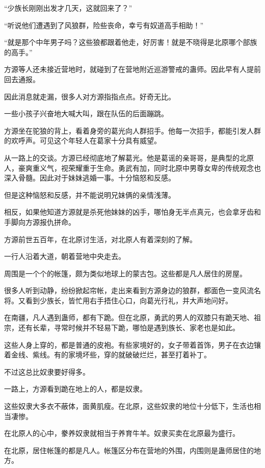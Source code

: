 \begin{this_body}
“少族长刚刚出发才几天，这就回来了？”

“听说他们遭遇到了风狼群，险些丧命，幸亏有奴道高手相助！”

“就是那个中年男子吗？这些狼都跟着他走，好厉害！就是不晓得是北原哪个部族的高手。”

方源等人还未接近营地时，就碰到了在营地附近巡游警戒的蛊师。因此早有人提前回去通报。

因此消息就走漏，很多人对方源指指点点。好奇无比。

一些小孩子兴奋地大喊大叫，跟在队伍的后面蹦跳。

方源坐在驼狼的背上，看着身旁的葛光向人群招手。他每一次招手，都能引发人群的欢呼声。可见这个年轻人在葛家十分具有威望。

从一路上的交谈。方源已经彻底地了解葛光。他是葛谣的亲哥哥，是典型的北原人，豪爽重义气，视荣耀重于生命。勇武有加，同时北原中男尊女卑的传统观念也深入骨髓。因此对于妹妹逃婚一事。十分恼怒和反感。

但是这种恼怒和反感，并不能说明兄妹俩的亲情浅薄。

相反，如果他知道方源就是杀死他妹妹的凶手，哪怕身无半点真元，也会拿牙齿和手脚向方源报仇拼命。

方源前世五百年，在北原讨生活，对北原人有着深刻的了解。

一行人沿着大道，朝着营地中央走去。

周围是一个个的帐篷，颇为类似地球上的蒙古包。这些都是凡人居住的房屋。

很多人听到动静，纷纷掀起帘帐，走出来看到方源身边的狼群，都面色一变风流名将。又看到少族长，皆忙用右手捂住心口，向葛光行礼，并大声地问好。

在南疆，凡人遇到蛊师，都有下跪。但在北原，勇武的男人的双膝只有跪天地、祖宗，还有长辈，寻常时候并不轻易下跪，哪怕是遇到族长、家老也是如此。

这些人身上穿的，都是普通的皮袍。有些家境好的，女子带着首饰，男子在衣边镶着金线、紫线。有的家境坏些，穿的就破破烂烂，甚至打着补丁。

不过这总比奴隶要好得多。

一路上，方源看到跪在地上的人，都是奴隶。

这些奴隶大多衣不蔽体，面黄肌瘦。在北原，这些奴隶的地位十分低下，生活也相当凄惨。

在北原人的心中，豢养奴隶就相当于养育牛羊。奴隶买卖在北原最为盛行。

在北原，居住帐篷的都是凡人。帐篷区分布在营地的外围，内围则是蛊师居住的地方。


\end{this_body}
